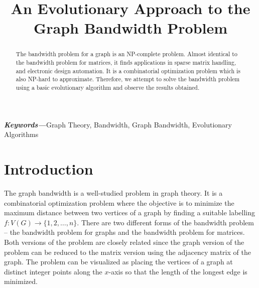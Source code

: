 \documentclass[conference,compsoc]{IEEEtran}
\begin{document}
\title{An Evolutionary Approach to the Graph Bandwidth Problem}
\author{
\and
{}
\and
{}
}

\maketitle

\begin{abstract}
  The bandwidth problem for a graph is an NP-complete problem. Almost identical to the 
  bandwidth problem for matrices, it finds applications in sparse matrix handling, and electronic design 
  automation. It is a combinatorial optimization problem which is also NP-hard to approximate. Therefore, 
  we attempt to solve the bandwidth problem using a basic evolutionary algorithm and observe the results obtained. 
\end{abstract}
\noindent \textit{\textbf{\small Keywords---}}{\small Graph Theory, Bandwidth, Graph Bandwidth, Evolutionary Algorithms}
\IEEEpeerreviewmaketitle

\section{Introduction} 
The graph bandwidth is a well-studied problem in graph theory. It is a combinatorial optimization problem where the objective 
is to minimize the maximum distance between two vertices of a graph by finding a suitable labelling $f: V(G) \to \{1, 2, \dots, n\}$.
There are two different forms of the bandwidth problem -- the bandwidth problem for graphs and the bandwidth problem for matrices. 
Both versions of the problem are closely related since the graph version of the problem can be reduced to the matrix version using 
the adjacency matrix of the graph. 
The problem can be visualized as placing the vertices of a graph at distinct integer points along the $x$-axis so that the 
length of the longest edge is minimized. 
\end{document}
